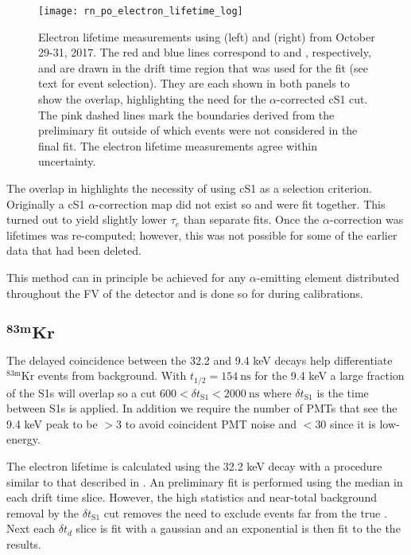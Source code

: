 \begin{figure}
\centering
\texttt{[image: rn\_po\_electron\_lifetime\_log]}
\caption{Electron lifetime measurements using  (left) and  (right) from October 29-31, 2017.  The red and blue
lines correspond to  and , respectively, and are drawn in the drift time region that was used for the fit (see
text for event selection).  They are each shown in both panels to show the \stwob overlap, highlighting the need for the
$\alpha$-corrected cS1 cut.  The pink dashed lines mark the boundaries derived from the preliminary fit outside of which events were not
considered in the final fit.  The electron lifetime measurements agree within uncertainty.}
\label{fig:electron_lifetimes_measurement_alphas_elifetime}
\end{figure}

The overlap in \stwob highlights the necessity of using cS1 as a selection criterion.  Originally a cS1 $\alpha$-correction map did not
exist so  and  were fit together.  This turned out to yield slightly lower $\tau_e$ than separate fits.  Once
the $\alpha$-correction was lifetimes was re-computed; however, this was not possible for some of the earlier data that had been
deleted.

This method can in principle be achieved for any $\alpha$-emitting element distributed throughout the FV of the detector and is done so
for  during  calibrations.


\subsection{$\mathbf{^{83m}Kr}$}
\label{subsec:electron_lifetimes_measurement_kr}
The delayed coincidence between the 32.2 and 9.4 keV decays help differentiate $\mathrm{^{83m}Kr}$ events from background.  With
$t_{1/2} = 154\ \mathrm{ns}$ for the 9.4 keV a large fraction of the S1s will overlap so a cut
$600 < \delta t_{\mathrm{S1}} < 2000\ \mathrm{ns}$
where $\delta t_{\mathrm{S1}}$ is the time between S1s is applied.  In addition we require the number of PMTs that see the 9.4 keV peak
to be $> 3$ to avoid coincident PMT noise and $< 30$ since it is low-energy.

The electron lifetime is calculated using the 32.2 keV decay with a procedure similar to that described in
.  An preliminary fit is performed using the median \stwob in each drift time
slice.  However, the high statistics and near-total background removal by the $\delta t_{\mathrm{S1}}$ cut
removes the need to exclude events far from the true \metakr.  Next each $\delta t_d$ slice is fit with a gaussian and an exponential
is then fit to the the results.



